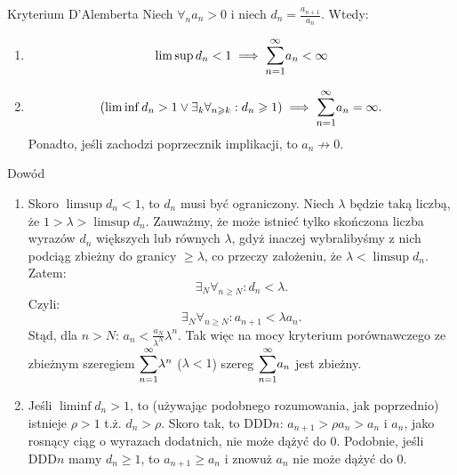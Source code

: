 \documentclass{article}
\numberwithin{defi}{section}
\numberwithin{defi}{section}
\newcommand{\oo}{\infty}
\renewcommand{\geq}{\geqslant}
\newcommand{\bsum}[2]{\mathlarger{\sum_{#1}^{#2}}}
\newcommand{\szerI}[1]{\bsum{n=1}{\oo} #1_n}
\begin{document}
\begin{twier}{Kryterium D'Alemberta}
    Niech $\forall_n a_n > 0$ i niech $d_n = \frac{a_{n+1}}{a_n}$. Wtedy: \begin{enumerate}
        \item \begin{equation}
            \limsup d_n < 1 \implies \szerI{a} < \oo
        \end{equation}
        \item \begin{equation}
            (\liminf d_n > 1 \vee \exists_k \forall_{n \geqslant k}: d_n \geqslant 1) \implies \szerI{a} = \oo.
        \end{equation} Ponadto, jeśli zachodzi poprzecznik implikacji, to $a_n \not \to 0$.
    \end{enumerate}
\end{twier} 
\begin{dow}{Dowód}
    \begin{enumerate}
        \item Skoro $\limsup d_n < 1$, to $d_n$ musi być ograniczony. Niech $\lambda$ będzie taką liczbą, że $1 > \lambda > \limsup d_n$. Zauważmy, że może istnieć tylko skończona liczba wyrazów $d_n$ większych lub równych $\lambda$, gdyż inaczej wybralibyśmy z nich podciąg zbieżny do granicy $\geq \lambda$, co przeczy założeniu, że $\lambda < \limsup d_n$. Zatem: \begin{equation*}
            \exists_{N} \forall_{n \geq N}: d_n < \lambda.
        \end{equation*} Czyli: \begin{equation*}
            \exists_{N} \forall_{n \geq N}: a_{n+1} < \lambda a_n.
        \end{equation*} Stąd, dla $n > N$: $a_{n} < \frac{a_N}{\lambda^N} \lambda^n$. Tak więc na mocy kryterium porównawczego ze zbieżnym szeregiem $\bsum{n=1}{\oo}\lambda^n$ ($\lambda < 1$) szereg $\szerI{a}$ jest zbieżny.

        \item Jeśli $\liminf d_n > 1$, to (używając podobnego rozumowania, jak poprzednio) istnieje $\rho > 1$ t.ż. $d_n > \rho$. Skoro tak, to DDD$n$: $a_{n+1} > \rho a_n > a_n$ i $a_n$, jako rosnący ciąg o wyrazach dodatnich, nie może dążyć do 0. Podobnie, jeśli DDD$n$ mamy $d_n \geq 1$, to $a_{n+1} \geq a_n$ i znowuż $a_n$ nie może dążyć do $0$.
    \end{enumerate}
\end{dow}
\end{document}
